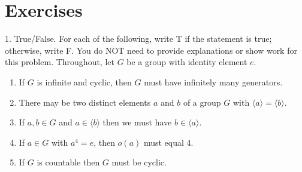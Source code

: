 \documentclass[10pt,]{book}
\theoremstyle{plain}
\theoremstyle{definition}
\theoremstyle{definition}
\theoremstyle{definition}
\theoremstyle{definition}
\numberwithin{equation}{section}
\begin{document}
\section[{Exercises}]{Exercises}\label{exercises-6}
\begin{exerciselist}
\item[1.]\hypertarget{exercise-34}{}
        True/False. For each of the following, write T if the statement is
        true; otherwise, write F. You do NOT need to provide explanations or show work for this problem. Throughout, let \(G\) be a group with identity element \(e\).
        \leavevmode%
\begin{enumerate}[label=(\alph*)]
\item\hypertarget{li-263}{}
              If \(G\) is infinite and cyclic, then \(G\) must have infinitely many generators.
\item\hypertarget{li-264}{}
              There may be two distinct elements \(a\) and \(b\) of a group \(G\) with \(\langle a\rangle =\langle b\rangle\).
\item\hypertarget{li-265}{}
              If \(a,b\in G\) and \(a\in \langle b\rangle\) then we must have \(b\in \langle a\rangle\).
\item\hypertarget{li-266}{}
              If \(a\in G\) with \(a^4=e\), then \(o(a)\) must equal \(4\).
\item\hypertarget{li-267}{}
              If \(G\) is countable then \(G\) must be cyclic.
\end{enumerate}


\end{exerciselist}
\end{document}
